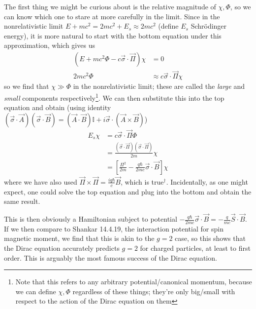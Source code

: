 \documentclass[12pt]{article}
\begin{document}
The first thing we might be curious about is the relative magnitude of $\chi, \Phi$, so we can know which one to stare at more carefully in the limit. Since in the nonrelativistic limit $E + mc^2 = 2mc^2 + E_s \approx 2mc^2$ (define $E_s$ Schr\"odinger energy), it is more natural to start with the bottom equation under this approximation, which gives us
\begin{align}
    \left( E + mc^2 \Phi - c\vec{\sigma} \cdot \vec{\Pi} \right)\chi &= 0\\
    2mc^2\Phi &\approx c\vec{\sigma} \cdot \vec{\Pi} \chi
\end{align}
so we find that $\chi \gg \Phi$ in the nonrelativistic limit; these are called the \emph{large} and \emph{small} components respectively\footnote{Note that this refers to any arbitrary potential/canonical momentum, because we can define $\chi, \Phi$ regardless of these things; they're only big/small with respect to the action of the Dirac equation on them}. We can then substitute this into the top equation and obtain (using identity $\left( \vec{\sigma}\cdot \vec{A} \right)\left( \vec{\sigma}\cdot \vec{B} \right) = \left( \vec{A} \cdot \vec{B} \right)\mathbb{I} + i\vec{\sigma} \cdot \left( \vec{A} \times \vec{B} \right)$)
\begin{align}
    E_s\chi &= c\vec{\sigma} \cdot \vec{\Pi}\Phi\\
    &= \frac{\left( \vec{\sigma} \cdot \vec{\Pi} \right)\left( \vec{\sigma} \cdot \vec{\Pi} \right)}{2m}\chi\\
    &= \left[ \frac{\Pi^2}{2m} - \frac{q\hbar}{2mc}\vec{\sigma} \cdot \vec{B} \right]\chi
\end{align}
where we have also used $\vec{\Pi} \times \vec{\Pi} = \frac{iq\hbar}{c}\vec{B}$, which is true$^\dagger$. Incidentally, as one might expect, one could solve the top equation and plug into the bottom and obtain the same result. 

This is then obviously a Hamiltonian subject to potential $-\frac{q\hbar}{2mc}\vec{\sigma} \cdot \vec{B} = -\frac{q}{mc}\vec{S} \cdot \vec{B}$. If we then compare to Shankar 14.4.19, the interaction potential for spin magnetic moment, we find that this is akin to the $g=2$ case, so this shows that the Dirac equation accurately predicts $g=2$ for charged particles, at least to first order. This is arguably the most famous success of the Dirac equation.
\end{document}
